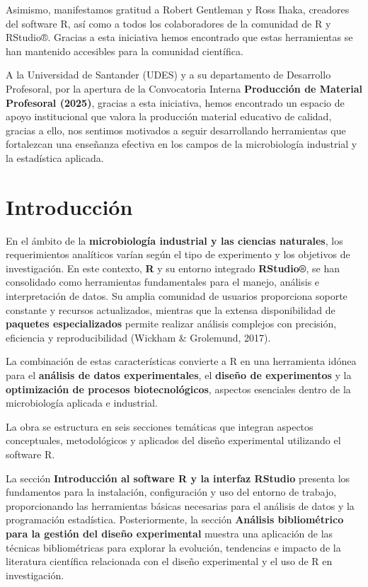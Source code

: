 \documentclass[
  spanish,
  letterpaper,
  DIV=11,
  numbers=noendperiod]{scrreprt}
\begin{document}
Asimismo, manifestamos gratitud a Robert Gentleman y Ross Ihaka,
creadores del software R, así como a todos los colaboradores de la
comunidad de R y RStudio®. Gracias a esta iniciativa hemos encontrado
que estas herramientas se han mantenido accesibles para la comunidad
científica.

A la Universidad de Santander (UDES) y a su departamento de Desarrollo
Profesoral, por la apertura de la Convocatoria Interna
\textbf{Producción de Material Profesoral (2025)}, gracias a esta
iniciativa, hemos encontrado un espacio de apoyo institucional que
valora la producción material educativo de calidad, gracias a ello, nos
sentimos motivados a seguir desarrollando herramientas que fortalezcan
una enseñanza efectiva en los campos de la microbiología industrial y la
estadística aplicada.


\chapter{Introducción}\label{introducciuxf3n}

En el ámbito de la \textbf{microbiología industrial y las ciencias
naturales}, los requerimientos analíticos varían según el tipo de
experimento y los objetivos de investigación. En este contexto,
\textbf{R} y su entorno integrado \textbf{RStudio®}, se han consolidado
como herramientas fundamentales para el manejo, análisis e
interpretación de datos. Su amplia comunidad de usuarios proporciona
soporte constante y recursos actualizados, mientras que la extensa
disponibilidad de \textbf{paquetes especializados} permite realizar
análisis complejos con precisión, eficiencia y reproducibilidad (Wickham
\& Grolemund, 2017).

La combinación de estas características convierte a R en una herramienta
idónea para el \textbf{análisis de datos experimentales}, el
\textbf{diseño de experimentos} y la \textbf{optimización de procesos
biotecnológicos}, aspectos esenciales dentro de la microbiología
aplicada e industrial.

La obra se estructura en seis secciones temáticas que integran aspectos
conceptuales, metodológicos y aplicados del diseño experimental
utilizando el software R.

La sección \textbf{Introducción al software R y la interfaz RStudio}
presenta los fundamentos para la instalación, configuración y uso del
entorno de trabajo, proporcionando las herramientas básicas necesarias
para el análisis de datos y la programación estadística. Posteriormente,
la sección \textbf{Análisis bibliométrico para la gestión del diseño
experimental} muestra una aplicación de las técnicas bibliométricas para
explorar la evolución, tendencias e impacto de la literatura científica
relacionada con el diseño experimental y el uso de R en investigación.
\end{document}
